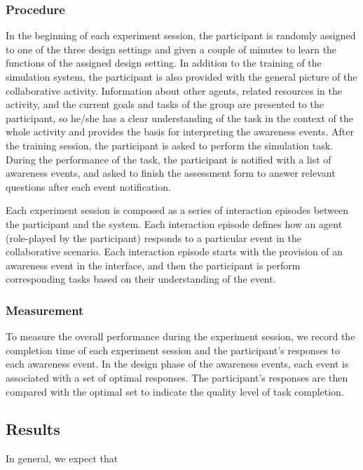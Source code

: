 \subsubsection{Procedure} %
\label{sub:procedure}
In the beginning of each experiment session, the participant is randomly assigned to one of the three design settings and given a couple of minutes to learn the functions of the assigned design setting. In addition to the training of the simulation system, the participant is also provided with the general picture of the collaborative activity. Information about other agents, related resources in the activity, and the current goals and tasks of the group are presented to the participant, so he/she has a clear understanding of the task in the context of the whole activity and provides the basis for interpreting the awareness events. After the training session, the participant is asked to perform the simulation task. During the performance of the task, the participant is notified with a list of awareness events, and asked to finish the assessment form to answer relevant questions after each event notification.

Each experiment session is composed as a series of interaction episodes between the participant and the system. Each interaction episode defines how an agent (role-played by the participant) responds to a particular event in the collaborative scenario. Each interaction episode starts with the provision of an awareness event in the interface, and then the participant is perform corresponding tasks based on their understanding of the event.


\subsubsection{Measurement} %
\label{sub:data_collection}
To measure the overall performance during the experiment session, we record the completion time of each experiment session and the participant's responses to each awareness event. In the design phase of the awareness events, each event is associated with a set of optimal responses. The participant's responses are then compared with the optimal set to indicate the quality level of task completion. 


\subsection{Results} %
\label{sec:results_and_discussion}
In general, we expect that 

